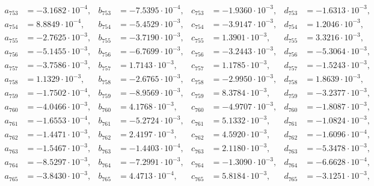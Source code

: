 \begin{align*}
  a_{ 753 } &= -3.1682 \cdot 10^{ -4 }, & b_{ 753 } &= -7.5395 \cdot 10^{ -4 }, & c_{ 753 } &= -1.9360 \cdot 10^{ -3 }, & d_{ 753 } &= -1.6313 \cdot 10^{ -3 }, \\ 
  a_{ 754 } &= 8.8849 \cdot 10^{ -4 }, & b_{ 754 } &= -5.4529 \cdot 10^{ -3 }, & c_{ 754 } &= -3.9147 \cdot 10^{ -3 }, & d_{ 754 } &= 1.2046 \cdot 10^{ -3 }, \\ 
  a_{ 755 } &= -2.7625 \cdot 10^{ -3 }, & b_{ 755 } &= -3.7190 \cdot 10^{ -3 }, & c_{ 755 } &= 1.3901 \cdot 10^{ -3 }, & d_{ 755 } &= 3.3216 \cdot 10^{ -3 }, \\ 
  a_{ 756 } &= -5.1455 \cdot 10^{ -3 }, & b_{ 756 } &= -6.7699 \cdot 10^{ -3 }, & c_{ 756 } &= -3.2443 \cdot 10^{ -3 }, & d_{ 756 } &= -5.3064 \cdot 10^{ -3 }, \\ 
  a_{ 757 } &= -3.7586 \cdot 10^{ -3 }, & b_{ 757 } &= 1.7143 \cdot 10^{ -3 }, & c_{ 757 } &= 1.1785 \cdot 10^{ -3 }, & d_{ 757 } &= -1.5243 \cdot 10^{ -3 }, \\ 
  a_{ 758 } &= 1.1329 \cdot 10^{ -3 }, & b_{ 758 } &= -2.6765 \cdot 10^{ -3 }, & c_{ 758 } &= -2.9950 \cdot 10^{ -3 }, & d_{ 758 } &= 1.8639 \cdot 10^{ -3 }, \\ 
  a_{ 759 } &= -1.7502 \cdot 10^{ -4 }, & b_{ 759 } &= -8.9569 \cdot 10^{ -3 }, & c_{ 759 } &= 8.3784 \cdot 10^{ -3 }, & d_{ 759 } &= -3.2377 \cdot 10^{ -3 }, \\ 
  a_{ 760 } &= -4.0466 \cdot 10^{ -3 }, & b_{ 760 } &= 4.1768 \cdot 10^{ -3 }, & c_{ 760 } &= -4.9707 \cdot 10^{ -3 }, & d_{ 760 } &= -1.8087 \cdot 10^{ -3 }, \\ 
  a_{ 761 } &= -1.6553 \cdot 10^{ -4 }, & b_{ 761 } &= -5.2724 \cdot 10^{ -3 }, & c_{ 761 } &= 5.1332 \cdot 10^{ -3 }, & d_{ 761 } &= -1.0824 \cdot 10^{ -3 }, \\ 
  a_{ 762 } &= -1.4471 \cdot 10^{ -3 }, & b_{ 762 } &= 2.4197 \cdot 10^{ -3 }, & c_{ 762 } &= 4.5920 \cdot 10^{ -3 }, & d_{ 762 } &= -1.6096 \cdot 10^{ -4 }, \\ 
  a_{ 763 } &= -1.5467 \cdot 10^{ -3 }, & b_{ 763 } &= -1.4403 \cdot 10^{ -4 }, & c_{ 763 } &= 2.1180 \cdot 10^{ -3 }, & d_{ 763 } &= -5.3478 \cdot 10^{ -3 }, \\ 
  a_{ 764 } &= -8.5297 \cdot 10^{ -3 }, & b_{ 764 } &= -7.2991 \cdot 10^{ -3 }, & c_{ 764 } &= -1.3090 \cdot 10^{ -3 }, & d_{ 764 } &= -6.6628 \cdot 10^{ -4 }, \\ 
  a_{ 765 } &= -3.8430 \cdot 10^{ -3 }, & b_{ 765 } &= 4.4713 \cdot 10^{ -4 }, & c_{ 765 } &= 5.8184 \cdot 10^{ -3 }, & d_{ 765 } &= -3.1251 \cdot 10^{ -3 }, \\ 

\end{align*}
